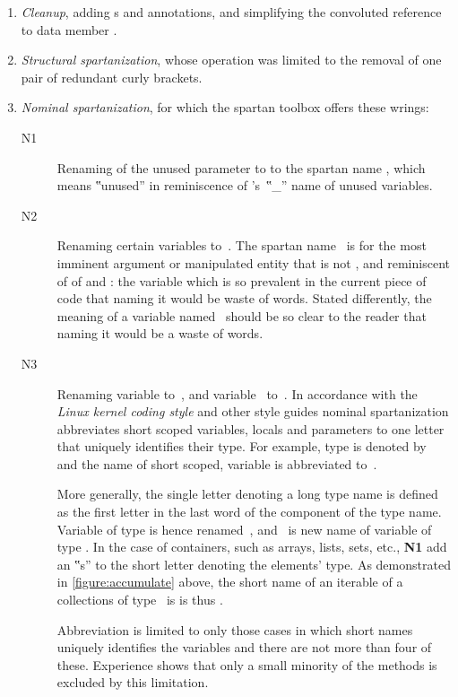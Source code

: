 \begin{enumerate}
  \item \emph{Cleanup}, adding s and  annotations,
      and simplifying the convoluted reference to data member .
    \item \emph{Structural spartanization}, whose operation was limited to the
      removal of one pair of redundant curly brackets.
    \item \emph{Nominal spartanization}, for which the spartan toolbox offers these
      wrings:
      \begin{description}
        \item[N1] Renaming of the unused
      parameter  to  to the spartan name
      \cc{\_\_}, which means ‟unused” in reminiscence of \Prolog's~‟\cc\_”
      name of unused variables.
    \item[N2] Renaming certain variables to~. The
      spartan name~ is for the most imminent argument or manipulated
      entity that is not , and reminiscent of  of \ML and
        \HyperTalk:
        the variable which is so prevalent in the current piece of code that
        naming it would be waste of words. Stated differently, the
        meaning of a variable named~ should be so clear to the reader that
        naming it would be a waste of words.

      \item[N3] Renaming variable  to~, and variable~
        to~. In accordance with the \emph{Linux kernel coding style}%
        and other style guides nominal spartanization abbreviates short scoped
        variables, locals and parameters to one letter that uniquely identifies
        their type. For example, type  is denoted by~ and the
        name of short scoped, variable  is abbreviated to~.

        More generally, the single letter denoting a long type name is defined
        as the first letter in the last word of the component of the type name.
        Variable  of type  is hence renamed~,
        and~ is new name of variable  of type
        . In the case of containers, such as arrays,
        lists, sets, etc., \textbf{N1} add an ‟s” to the short letter
        denoting the elements' type. As demonstrated in
        \cref{figure:accumulate} above, the short name of an iterable of a
        collections of type~ is is thus .

        Abbreviation is limited to only those cases in which short names
        uniquely identifies the variables and there are not more than four of
        these. Experience shows that only a small minority of the methods is
        excluded by this limitation.
\end{description}
  \end{enumerate}

